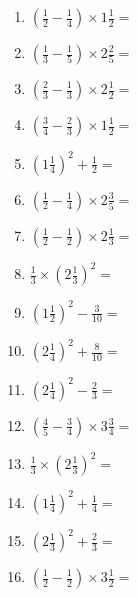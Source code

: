 \documentclass[12pt]{article}
\begin{document}
\begin{enumerate}
\item \large $ \left( \frac{1}{2} - \frac{1}{4} \right) \times 1 \frac{1}{2} = $ \vspace{1.6cm}
\item \large $ \left( \frac{1}{3} - \frac{1}{5} \right) \times 2 \frac{2}{5} = $ \vspace{1.6cm}
\item \large $ \left( \frac{2}{3} - \frac{1}{3} \right) \times 2 \frac{1}{2} = $ \vspace{1.6cm}
\item \large $ \left( \frac{3}{4} - \frac{2}{3} \right) \times 1 \frac{1}{2} = $ \vspace{1.6cm}
\item \large $ \left( 1 \frac{1}{4} \right)^2 + \frac{1}{2} = $ \vspace{1.6cm}
\item \large $ \left( \frac{1}{2} - \frac{1}{4} \right) \times 2 \frac{3}{5} = $ \vspace{1.6cm}
\newpage
\item \large $ \left( \frac{1}{2} - \frac{1}{2} \right) \times 2 \frac{1}{3} = $ \vspace{1.6cm}
\item \large $ \frac{1}{3} \times \left( 2 \frac{1}{3} \right)^2 = $ \vspace{1.6cm}
\item \large $ \left( 1 \frac{1}{2} \right)^2 - \frac{3}{10} = $ \vspace{1.6cm}
\item \large $ \left( 2 \frac{1}{4} \right)^2 + \frac{8}{10} = $ \vspace{1.6cm}
\item \large $ \left( 2 \frac{1}{4} \right)^2 - \frac{2}{3} = $ \vspace{1.6cm}
\item \large $ \left( \frac{4}{5} - \frac{3}{4} \right) \times 3 \frac{3}{4} = $ \vspace{1.6cm}
\item \large $ \frac{1}{3} \times \left( 2 \frac{1}{3} \right)^2 = $ \vspace{1.6cm}
\item \large $ \left( 1 \frac{1}{4} \right)^2 + \frac{1}{4} = $ \vspace{1.6cm}
\item \large $ \left( 2 \frac{1}{3} \right)^2 + \frac{2}{3} = $ \vspace{1.6cm}
\item \large $ \left( \frac{1}{2} - \frac{1}{2} \right) \times 3 \frac{1}{2} = $ \vspace{1.6cm}

\end{enumerate}
\end{document}
